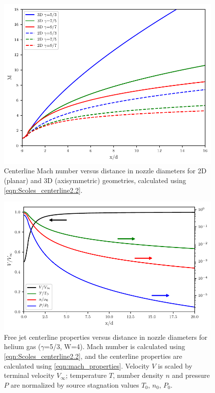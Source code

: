 \begin{figure}
	\centering
	\includegraphics{figures/chap2/Scoles_Fig25.pdf}
	\caption{Centerline Mach number versus distance in nozzle diameters for 2D (planar) and 3D (axisymmetric) geometries, calculated using \cref{eqn:Scoles_centerline2.2}.}
	\label{fig:scoles_mach}
\end{figure}

\begin{figure}
	\centering
	\includegraphics{figures/chap2/Scoles_Fig23.pdf}
	\caption{Free jet centerline properties versus distance in nozzle diameters for helium gas ($\gamma$=5/3, W=4). Mach number is calculated using \cref{eqn:Scoles_centerline2.2}, and the centerline properties are calculated using \cref{eqn:mach_properties}. Velocity $V$ is scaled by terminal velocity $V_{\infty}$; temperature $T$, number density $n$ and pressure $P$ are normalized by source stagnation values $T_0$, $n_0$, $P_0$.}
	\label{fig:scoles_centerline}
\end{figure}

